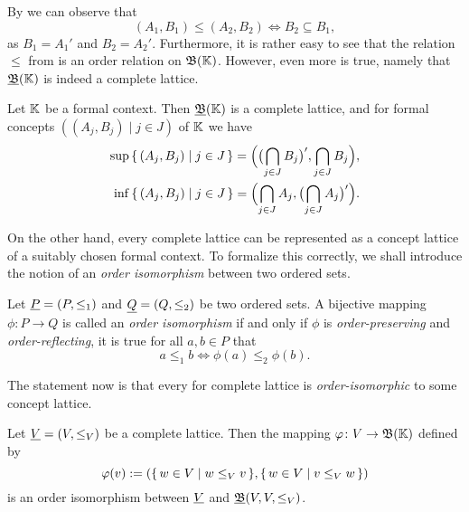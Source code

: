 By  we can observe that
\begin{equation*}
  (A_1, B_1) \leq (A_2, B_2) \iff B_2 \subseteq B_1,
\end{equation*}
as $B_1 = A_1'$ and $B_2 = A_2'$.  Furthermore, it is rather easy to see that the relation
$\leq$ from  is an order relation on $\operatorname{{\mathfrak{B}}}({\mathbb{K}})$.  However,
even more is true, namely that ${\underline{\operatorname{{\mathfrak{B}}}}}({\mathbb{K}})$ is indeed a complete lattice.

\begin{Theorem}
  \label{thm:concept-lattices-are-complete-lattices}
  Let ${\mathbb{K}}$ be a formal context.  Then ${\underline{\operatorname{{\mathfrak{B}}}}}({\mathbb{K}})$ is a complete lattice, and
  for formal concepts $((A_j, B_j) \mid j \in J)$ of ${\mathbb{K}}$ we have
  \begin{align*}
    \sup {\ensuremath{\{\, (A_j, B_j) \mid j \in J \,\}}} = \Bigl( \bigl( \bigcap_{j \in J} B_j \bigr)' ,
    \bigcap_{j \in J} B_j \Bigr), \\
    \inf {\ensuremath{\{\, (A_j, B_j) \mid j \in J \,\}}} = \Bigl( \bigcap_{j \in J} A_j, \bigl( \bigcap_{j
      \in J} A_j \bigr)' \Bigr).
  \end{align*}
\end{Theorem}

On the other hand, every complete lattice can be represented as a concept lattice of a
suitably chosen formal context.  To formalize this correctly, we shall introduce the
notion of an \emph{order isomorphism} between two ordered sets.

\begin{Definition}
  \label{def:order-isomorphism}
  Let ${\underline{P}} = (P, \leq_1)$ and ${\underline{Q}} = (Q, \leq_2)$ be two ordered sets.  A bijective
  mapping $\phi \colon P \to Q$ is called an \emph{order isomorphism} if and only if
  $\phi$ is \emph{order-preserving} and \emph{order-reflecting}, \ie it is true for all
  $a, b \in P$ that
  \begin{equation*}
    a \leq_1 b \iff \phi(a) \leq_2 \phi(b).
  \end{equation*}
\end{Definition}

The statement now is that every for complete lattice is \emph{order-isomorphic} to some
concept lattice.

\begin{Theorem}
  \label{thm:complete-lattices-are-concept-lattices}
  Let ${\underline{V}} = (V, \leq_V)$ be a complete lattice.  Then the mapping $\varphi \colon V \to
  \operatorname{{\mathfrak{B}}}({\mathbb{K}})$ defined by
  \begin{equation*}
    \varphi(v) := ({\{\, w \in V \mid w \leq_V v\,\}}, {\{\, w \in V \mid v \leq_V w \,\}})
  \end{equation*}
  is an order isomorphism between ${\underline{V}}$ and ${\underline{\operatorname{{\mathfrak{B}}}}}(V, V, \leq_V)$.
\end{Theorem}

